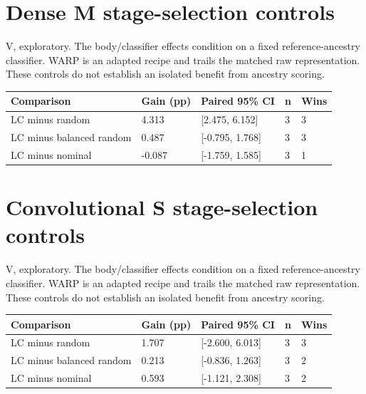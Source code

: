 \documentclass[10pt,a4paper]{article}
\begin{document}
\section*{Dense M stage-selection controls}
V, exploratory. The body/classifier effects condition on a fixed reference-ancestry classifier. WARP is an adapted recipe and trails the matched raw representation. These controls do not establish an isolated benefit from ancestry scoring.
\par\bigskip
\setlength{\tabcolsep}{2pt}
\begin{tabular}{@{}p{57mm}p{47.0mm}p{47.0mm}p{47.0mm}p{47.0mm}@{}}
\toprule
Comparison & Gain (pp) & Paired 95\% CI & n & Wins \\ \midrule
LC minus random & 4.313 & [2.475, 6.152] & 3 & 3 \\
LC minus balanced random & 0.487 & [-0.795, 1.768] & 3 & 3 \\
LC minus nominal & -0.087 & [-1.759, 1.585] & 3 & 1 \\
\bottomrule
\end{tabular}
\clearpage
\section*{Convolutional S stage-selection controls}
V, exploratory. The body/classifier effects condition on a fixed reference-ancestry classifier. WARP is an adapted recipe and trails the matched raw representation. These controls do not establish an isolated benefit from ancestry scoring.
\par\bigskip
\setlength{\tabcolsep}{2pt}
\begin{tabular}{@{}p{57mm}p{47.0mm}p{47.0mm}p{47.0mm}p{47.0mm}@{}}
\toprule
Comparison & Gain (pp) & Paired 95\% CI & n & Wins \\ \midrule
LC minus random & 1.707 & [-2.600, 6.013] & 3 & 3 \\
LC minus balanced random & 0.213 & [-0.836, 1.263] & 3 & 2 \\
LC minus nominal & 0.593 & [-1.121, 2.308] & 3 & 2 \\
\bottomrule
\end{tabular}
\clearpage
\end{document}
